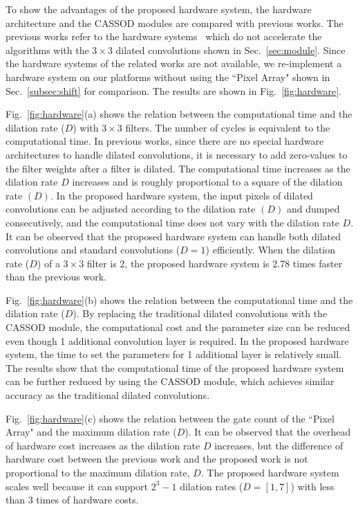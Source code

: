 \documentclass[10pt,twocolumn,letterpaper]{article}
\begin{document}
To show the advantages of the proposed hardware system, the hardware architecture and the CASSOD modules are compared with previous works. The previous works refer to the hardware systems~\cite{Chen16, Ma18} which do not accelerate the algorithms with the $3 \times 3$ dilated convolutions shown in Sec.~\ref{sec:module}. Since the hardware systems of the related works are not available, we re-implement a hardware system on our platforms without using the ``Pixel Array" shown in Sec.~\ref{subsec:shift} for comparison. The results are shown in Fig.~\ref{fig:hardware}.

Fig.~\ref{fig:hardware}(a) shows the relation between the computational time and the dilation rate ($D$) with $3 \times 3$ filters. The number of cycles is equivalent to the computational time. In previous works, since there are no special hardware architectures to handle dilated convolutions, it is necessary to add zero-values to the filter weights after a filter is dilated. The computational time increases as the dilation rate $D$ increases and is roughly proportional to a square of the dilation rate $(D)$. In the proposed hardware system, the input pixels of dilated convolutions can be adjusted according to the dilation rate $(D)$  and dumped consecutively, and the computational time does not vary with the dilation rate $D$. It can be observed that the proposed hardware system can handle both dilated convolutions and standard convolutions ($D = 1$) efficiently. When the dilation rate ($D$) of a $3 \times 3$ filter is 2, the proposed hardware system is 2.78 times faster than the previous work.

Fig.~\ref{fig:hardware}(b) shows the relation between the computational time and the dilation rate ($D$). By replacing the traditional dilated convolutions with the CASSOD module, the computational cost and the parameter size can be reduced even though 1 additional convolution layer is required. In the proposed hardware system, the time to set the parameters for 1 additional layer is relatively small. The results show that the computational time of the proposed hardware system can be further reduced by using the CASSOD module, which achieves similar accuracy as the traditional dilated convolutions.

Fig.~\ref{fig:hardware}(c) shows the relation between the gate count of the ``Pixel Array" and the maximum dilation rate ($D$). It can be observed that the overhead of hardware cost increases as the dilation rate $D$ increases, but the difference of hardware cost between the previous work and the proposed work is not proportional to the maximum dilation rate, $D$. The proposed hardware system scales well because it can support $2^3 - 1$ dilation rates ($D=[1, 7]$) with less than $3$ times of hardware costs.
\end{document}
